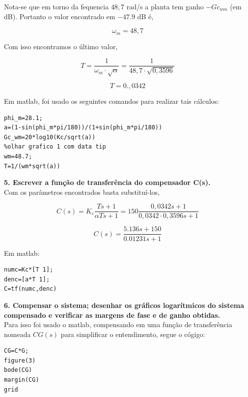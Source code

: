 Nota-se que em torno da fequencia $48,7$ rad/s a planta tem ganho $-Gc_{wm}$ (em dB). Portanto o valor encontrado em $-47.9$ dB é,

{\color{red} \[ \boxed{\omega_m = 48,7} \]}

Com isso encontramos o último valor, 

\[ T = \dfrac{1}{\omega_m \cdot \sqrt{\alpha}} = \dfrac{1}{48,7\cdot \sqrt{0,3596}}\]

{\color{red} \[ \boxed{T = 0.,0342} \] }

\noindent Em matlab, foi usado os seguintes comandos para realizar tais cálculos:

\begin{lstlisting}[style=matlab]
phi_m=28.1;
a=(1-sin(phi_m*pi/180))/(1+sin(phi_m*pi/180))
Gc_wm=20*log10(Kc/sqrt(a)) 
%olhar grafico 1 com data tip
wm=48.7; 
T=1/(wm*sqrt(a)) 
\end{lstlisting}\vspace{0.2cm}


\noindent \textbf{5. Escrever a função de transferência do compensador C(s).}\\

Com os parâmetros encontrados basta substituí-los,

\[ C(s) = K_c \dfrac{Ts+1}{\alpha T s + 1} = 150\dfrac{0,0342s + 1}{0,0342\cdot 0,3596 s + 1}\]

{\color{red} \[ \boxed{C(s) = \dfrac{5.136 s + 150}{0.01231 s + 1} } \]}

\noindent Em matlab:

\begin{lstlisting}[style=matlab]
numc=Kc*[T 1];
denc=[a*T 1];
C=tf(numc,denc)
\end{lstlisting}\vspace{0.2cm}


\noindent \textbf{6. Compensar o sistema; desenhar os gráficos logarítmicos do sistema compensado e verificar as margens de fase e de ganho obtidas.}\\

Para isso foi usado o matlab, compensando em uma função de transferência nomeada $CG(s)$ para simplificar o entendimento, segue o cógigo:

\begin{lstlisting}[style=matlab]
CG=C*G;
figure(3)
bode(CG)
margin(CG)
grid
\end{lstlisting}\vspace{0.2cm}

